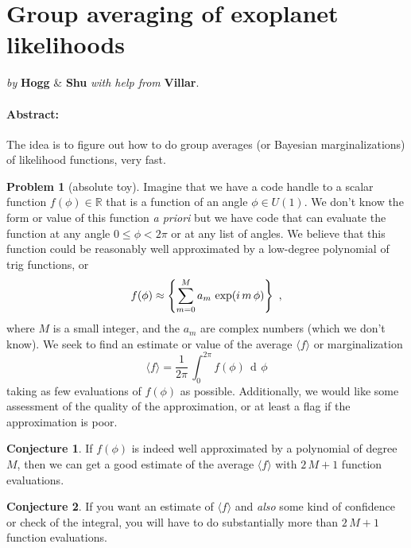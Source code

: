 \documentclass{article}
\let\Re\relax
\DeclareMathOperator{\Re}{Re}
\DeclareMathOperator{\dd}{d\!}
\newcommand{\mean}[1]{\langle{#1}\rangle}
\theoremstyle{definition}
\newcommand{\problemname}{Problem}
\newtheorem{problem}{\problemname}
\newtheorem{conjecture}{Conjecture}[problem]
\theoremstyle{definition}
\begin{document}
    
\section*{Group averaging of exoplanet likelihoods}
\noindent
\textit{by} \textbf{Hogg} \& \textbf{Shu} \textit{with help from} \textbf{Villar}.

\paragraph{Abstract:}
The idea is to figure out how to do group averages (or Bayesian mar\-gin\-a\-li\-za\-tions) of likelihood functions, very fast.

\begin{problem}[absolute toy]\label{prob:toy}
Imagine that we have a code handle to a scalar function $f(\phi)\in\mathbb{R}$ that is a function of an angle $\phi\in U(1)$.
We don't know the form or value of this function \textsl{a priori} but we have code that can evaluate the function at any angle $0\leq\phi<2\pi$ or at any list of angles.
We believe that this function could be reasonably well approximated by a low-degree polynomial of trig functions, or
\begin{equation}
    f(\phi) \approx \Re\left\{\sum_{m=0}^M a_m\,\exp(i\,m\,\phi)\right\} ~,
\end{equation}
where $M$ is a small integer, and the $a_m$ are complex numbers (which we don't know).
We seek to find an estimate or value of the average $\mean{f}$ or marginalization
\begin{equation}
    \mean{f} = \frac{1}{2\pi}\,\int_0^{2\pi} f(\phi)\,\dd\phi
\end{equation}
taking as few evaluations of $f(\phi)$ as possible.
Additionally, we would like some assessment of the quality of the approximation, or at least a flag if the approximation is poor.
\end{problem}

\begin{conjecture}
If $f(\phi)$ is indeed well approximated by a polynomial of degree $M$, then we can get a good estimate of the average $\mean{f}$ with $2\,M+1$ function evaluations.
\end{conjecture}

\begin{conjecture}
If you want an estimate of $\mean{f}$ and \emph{also} some kind of confidence or check of the integral, you will have to do substantially more than $2\,M+1$ function evaluations.
\end{conjecture}
\end{document}
